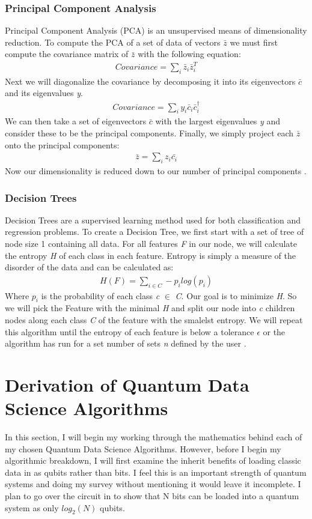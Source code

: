 \documentclass[conference]{IEEEtran}
\begin{document}
\subsubsection{Principal Component Analysis}
Principal Component Analysis (PCA) is an unsupervised means of dimensionality reduction. To compute the PCA of a set of data of vectors $\bar{z}$ we must first compute the covariance matrix of $\bar{z}$ with the following equation:
\begin{align*}
Covariance = \sum_i \bar{z}_i\bar{z}^T_i
\end{align*}
\indent Next we will diagonalize the covariance by decomposing it into its eigenvectors \emph{$\bar{c}$} and its eigenvalues \emph{{y}}.
\begin{align*}
Covariance = \sum_i y_i\bar{c}_i\bar{c}_i^\dagger
\end{align*}
\indent We can then take a set of eigenvectors \emph{$\bar{c}$} with the largest eigenvalues \emph{{y}} and consider these to be the principal components. Finally, we simply project each $\bar{z}$ onto the principal components: 
\begin{align*}
    \bar{z} = \sum_i z_i \bar{c_i}
\end{align*}
Now our dimensionality is reduced down to our number of principal components \cite{b7}. 
\subsubsection{Decision Trees}
Decision Trees are a supervised learning method used for both classification and regression problems. To create a Decision Tree, we first start with a set of tree of node size 1 containing all data. For all features \emph{F} in our node, we will calculate the entropy \emph{H} of each class  in each feature. Entropy is simply a measure of the disorder of the data and can be calculated as:
\begin{align*}
    H(F) = \sum_{i\in C} -p_i log(p_i)
\end{align*}
Where \emph{$p_i$} is the probability of each class \emph{c} $\in$ \emph{C}. Our goal is to minimize \emph{H}. So we will pick the Feature with the minimal \emph{H} and split our node into \emph{c} children nodes along each class \emph{C} of the feature with the smalelst entropy. We will repeat this algorithm until the entropy of each feature is below a tolerance $\epsilon$ or the algorithm has run for a set number of sets \emph{n} defined by the user \cite{b11}. 

\section{Derivation of Quantum Data Science Algorithms}
In this section, I will begin my working through the mathematics behind each of my chosen Quantum Data Science Algorithms. However, before I begin my algorithmic breakdown, I will first examine the inherit benefits of loading classic data in as qubits rather than bits. I feel this is an important strength of quantum systems and doing my survey without mentioning it would leave it incomplete. I plan to go over the circuit in \cite{b12} to show that N bits can be loaded into a quantum system as only $log_2(N)$ qubits.   
\end{document}
